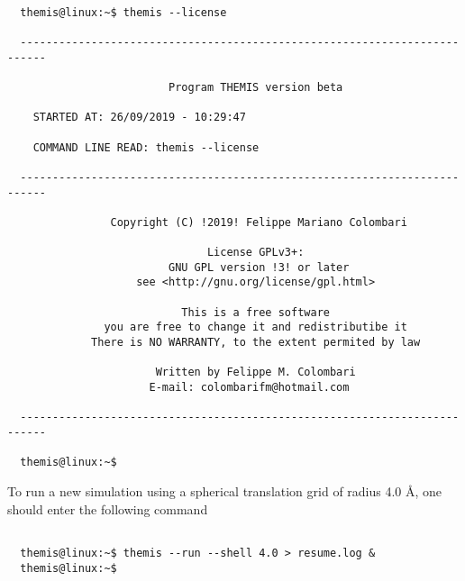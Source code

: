 \documentclass{achemso}
\begin{document}
\begin{center}
  \begin{minipage}{0.7\textwidth}
    \vskip0.25cm
    \begin{verbatim}

  themis@linux:~$ themis --license

  --------------------------------------------------------------------------

                         Program THEMIS version beta

    STARTED AT: 26/09/2019 - 10:29:47

    COMMAND LINE READ: themis --license

  --------------------------------------------------------------------------

                Copyright (C) !2019! Felippe Mariano Colombari       

                               License GPLv3+:                     
                         GNU GPL version !3! or later                
                    see <http://gnu.org/license/gpl.html>          

                           This is a free software                 
               you are free to change it and redistributibe it     
             There is NO WARRANTY, to the extent permited by law 

                       Written by Felippe M. Colombari             
                      E-mail: colombarifm@hotmail.com              

  --------------------------------------------------------------------------

  themis@linux:~$ 

    \end{verbatim}
  \end{minipage}
\end{center}

  To run a new simulation using a spherical translation grid of radius 4.0 \AA,
  one should enter the following command 

\begin{center}
  \begin{minipage}{0.55\textwidth}
    \vskip0.25cm
    \begin{verbatim}

  themis@linux:~$ themis --run --shell 4.0 > resume.log &
  themis@linux:~$ 

    \end{verbatim}
  \end{minipage}
\end{center}
\end{document}

